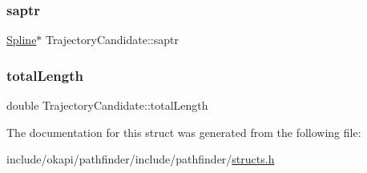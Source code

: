 \subsubsection{\texorpdfstring{saptr}{saptr}}
{\footnotesize\ttfamily \mbox{\hyperlink{structSpline}{Spline}}$\ast$ Trajectory\+Candidate\+::saptr}

\mbox{\label{structTrajectoryCandidate_a333f3e0ed261240bc43dbbffced79edb}} 
\subsubsection{\texorpdfstring{totalLength}{totalLength}}
{\footnotesize\ttfamily double Trajectory\+Candidate\+::total\+Length}



The documentation for this struct was generated from the following file\+:\begin{DoxyCompactItemize}
\item 
include/okapi/pathfinder/include/pathfinder/\mbox{\hyperlink{structs_8h}{structs.\+h}}\end{DoxyCompactItemize}
